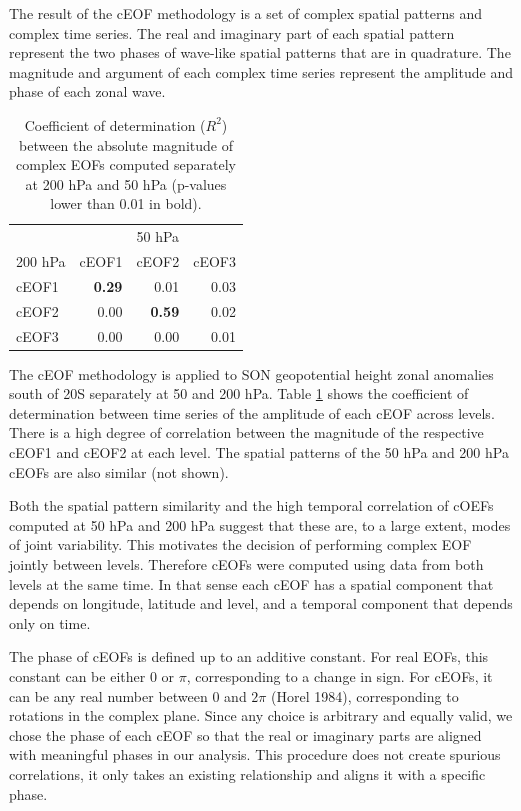 \documentclass[smallextended]{svjour3}       %
\begin{document}
The result of the cEOF methodology is a set of complex spatial patterns and complex time series.
The real and imaginary part of each spatial pattern represent the two phases of wave-like spatial patterns that are in quadrature.
The magnitude and argument of each complex time series represent the amplitude and phase of each zonal wave.



\begin{table}

\caption{\label{tab:corr-ceof-splitted}Coefficient of determination (\(R^2\)) between the absolute magnitude of complex EOFs computed separately at 200 hPa and 50 hPa (p-values lower than 0.01 in bold).}
\centering
\begin{tabular}[t]{l>{}r>{}r>{}r}
\toprule
\multicolumn{1}{c}{} & \multicolumn{3}{c}{50 hPa} \\
\cmidrule(l{3pt}r{3pt}){2-4}
200 hPa & cEOF1 & cEOF2 & cEOF3\\
\midrule
cEOF1 & \textbf{0.29} & 0.01 & 0.03\\
cEOF2 & 0.00 & \textbf{0.59} & 0.02\\
cEOF3 & 0.00 & 0.00 & 0.01\\
\bottomrule
\end{tabular}
\end{table}

The cEOF methodology is applied to SON geopotential height zonal anomalies south of 20\degree S separately at 50 and 200 hPa.
Table \ref{tab:corr-ceof-splitted} shows the coefficient of determination between time series of the amplitude of each cEOF across levels.
There is a high degree of correlation between the magnitude of the respective cEOF1 and cEOF2 at each level.
The spatial patterns of the 50 hPa and 200 hPa cEOFs are also similar (not shown).

Both the spatial pattern similarity and the high temporal correlation of cOEFs computed at 50 hPa and 200 hPa suggest that these are, to a large extent, modes of joint variability.
This motivates the decision of performing complex EOF jointly between levels.
Therefore cEOFs were computed using data from both levels at the same time.
In that sense each cEOF has a spatial component that depends on longitude, latitude and level, and a temporal component that depends only on time.

The phase of cEOFs is defined up to an additive constant.
For real EOFs, this constant can be either 0 or \(\pi\), corresponding to a change in sign.
For cEOFs, it can be any real number between 0 and \(2\pi\) (Horel 1984), corresponding to rotations in the complex plane.
Since any choice is arbitrary and equally valid, we chose the phase of each cEOF so that the real or imaginary parts are aligned with meaningful phases in our analysis.
This procedure does not create spurious correlations, it only takes an existing relationship and aligns it with a specific phase.
\end{document}
